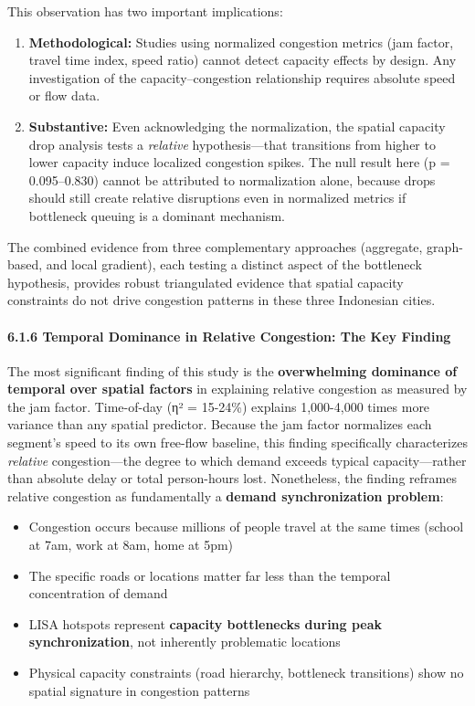 This observation has two important implications:

\begin{enumerate}
\def\labelenumi{\arabic{enumi}.}
\item
  \textbf{Methodological:} Studies using normalized congestion metrics (jam factor, travel time index, speed ratio) cannot detect capacity effects by design. Any investigation of the capacity--congestion relationship requires absolute speed or flow data.
\item
  \textbf{Substantive:} Even acknowledging the normalization, the spatial capacity drop analysis tests a \emph{relative} hypothesis---that transitions from higher to lower capacity induce localized congestion spikes. The null result here (p = 0.095--0.830) cannot be attributed to normalization alone, because drops should still create relative disruptions even in normalized metrics if bottleneck queuing is a dominant mechanism.
\end{enumerate}

The combined evidence from three complementary approaches (aggregate, graph-based, and local gradient), each testing a distinct aspect of the bottleneck hypothesis, provides robust triangulated evidence that spatial capacity constraints do not drive congestion patterns in these three Indonesian cities.

\paragraph{6.1.6 Temporal Dominance in Relative Congestion: The Key Finding}\label{temporal-dominance-in-relative-congestion-the-key-finding}

The most significant finding of this study is the \textbf{overwhelming dominance of temporal over spatial factors} in explaining relative congestion as measured by the jam factor. Time-of-day (η² = 15-24\%) explains 1,000-4,000 times more variance than any spatial predictor. Because the jam factor normalizes each segment's speed to its own free-flow baseline, this finding specifically characterizes \emph{relative} congestion---the degree to which demand exceeds typical capacity---rather than absolute delay or total person-hours lost. Nonetheless, the finding reframes relative congestion as fundamentally a \textbf{demand synchronization problem}:

\begin{itemize}
\tightlist
\item
  Congestion occurs because millions of people travel at the same times (school at 7am, work at 8am, home at 5pm)
\item
  The specific roads or locations matter far less than the temporal concentration of demand
\item
  LISA hotspots represent \textbf{capacity bottlenecks during peak synchronization}, not inherently problematic locations
\item
  Physical capacity constraints (road hierarchy, bottleneck transitions) show no spatial signature in congestion patterns
\end{itemize}

